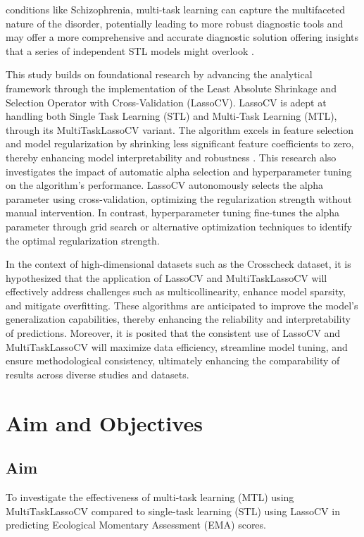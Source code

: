 conditions like Schizophrenia, multi-task learning can capture the multifaceted nature of the disorder, potentially leading to more robust diagnostic tools and may offer a more comprehensive and accurate diagnostic solution offering insights that a series of independent STL models might overlook \citep{thieme2020machine}. 

This study builds on foundational research by advancing the analytical framework through the implementation of the Least Absolute Shrinkage and Selection Operator with Cross-Validation (LassoCV). LassoCV is adept at handling both Single Task Learning (STL) and Multi-Task Learning (MTL), through its MultiTaskLassoCV variant. The algorithm excels in feature selection and model regularization by shrinking less significant feature coefficients to zero, thereby enhancing model interpretability and robustness \citep{tseng2020using}. This research also investigates the impact of automatic alpha selection and hyperparameter tuning on the algorithm's performance. LassoCV autonomously selects the alpha parameter using cross-validation, optimizing the regularization strength without manual intervention. In contrast, hyperparameter tuning fine-tunes the alpha parameter through grid search or alternative optimization techniques to identify the optimal regularization strength.

In the context of high-dimensional datasets such as the Crosscheck dataset, it is hypothesized that the application of LassoCV and MultiTaskLassoCV will effectively address challenges such as multicollinearity, enhance model sparsity, and mitigate overfitting. These algorithms are anticipated to improve the model's generalization capabilities, thereby enhancing the reliability and interpretability of predictions. Moreover, it is posited that the consistent use of LassoCV and MultiTaskLassoCV will maximize data efficiency, streamline model tuning, and ensure methodological consistency, ultimately enhancing the comparability of results across diverse studies and datasets.
\section{Aim and Objectives}
\subsection{Aim}
To investigate the effectiveness of multi-task learning (MTL) using MultiTaskLassoCV compared to single-task learning (STL) using LassoCV in predicting Ecological Momentary Assessment (EMA) scores.
